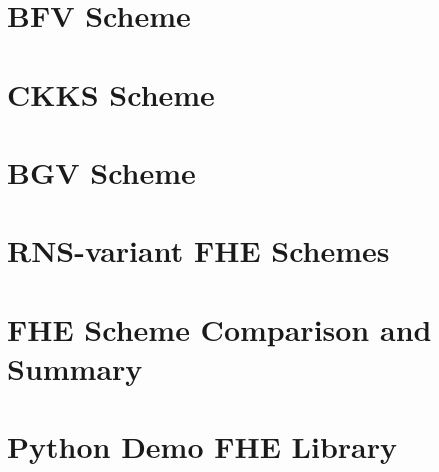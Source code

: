 \documentclass[11pt]{article}
\begin{document}
\newpage

\section{BFV Scheme}
\label{sec:bfv}


\newpage

\section{CKKS Scheme}
\label{sec:ckks}



\clearpage

\section{BGV Scheme}
\label{sec:bgv}


\clearpage


\section{RNS-variant FHE Schemes}
\label{sec:rns}


\clearpage

\section{FHE Scheme Comparison and Summary}



\clearpage

\section{Python Demo FHE Library}


%
\clearpage






%
\end{document}
